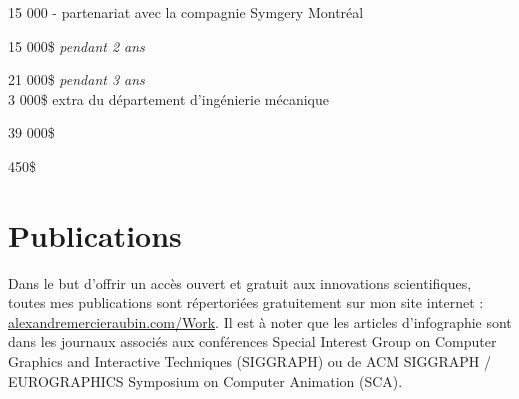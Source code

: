 \documentclass[10pt]{article} %
\begin{document}
{
 15 000 - partenariat avec la compagnie Symgery Montréal\\
}

{
 15 000\$ \textit{pendant 2 ans} \\
}

{
 21 000\$ \textit{pendant 3 ans} \\
 3 000\$ extra du département d'ingénierie mécanique\\
}

{
\textit{} 39 000\$\\
}


{
\textit{} 450\$\\
}

\section{Publications}
Dans le but d'offrir un accès ouvert et gratuit aux innovations scientifiques, toutes mes publications sont répertoriées gratuitement sur mon site internet : \href{https://alexandremercieraubin.com/Work}{alexandremercieraubin.com/Work}. Il est à noter que les articles d'infographie sont dans les journaux associés aux conférences Special Interest Group on Computer Graphics and Interactive Techniques (SIGGRAPH) ou de ACM SIGGRAPH / EUROGRAPHICS Symposium on Computer Animation (SCA).
\end{document}
